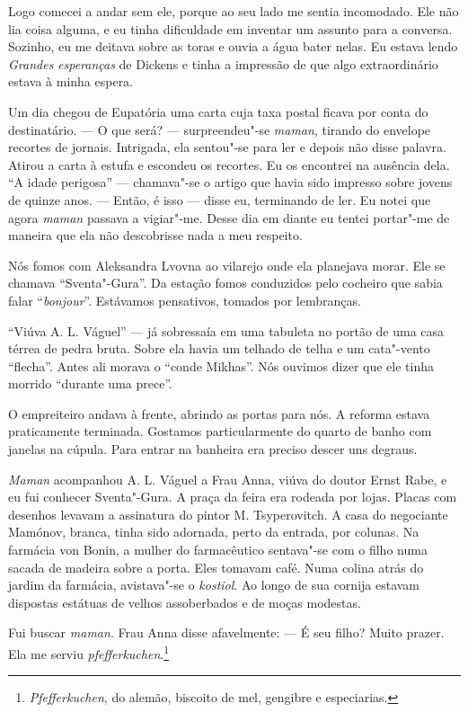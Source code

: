 Logo comecei a andar sem ele, porque ao seu lado me sentia incomodado.
Ele não lia coisa alguma, e eu tinha dificuldade em inventar um assunto
para a conversa. Sozinho, eu me deitava sobre as toras e ouvia a água
bater nelas. Eu estava lendo \emph{Grandes} \emph{esperanças} de Dickens
e tinha a impressão de que algo extraordinário estava à minha espera.

Um dia chegou de Eupatória uma carta cuja taxa postal ficava por conta
do destinatário. --- O que será? --- surpreendeu"-se \emph{maman},
tirando do envelope recortes de jornais. Intrigada, ela sentou"-se para
ler e depois não disse palavra. Atirou a carta à estufa e escondeu os
recortes. Eu os encontrei na ausência dela. ``A idade perigosa'' ---
chamava"-se o artigo que havia sido impresso sobre jovens de quinze anos.
--- Então, é isso --- disse eu, terminando de ler. Eu notei que agora
\emph{maman} passava a vigiar"-me. Desse dia em diante eu tentei
portar"-me de maneira que ela não descobrisse nada a meu respeito.

Nós fomos com Aleksandra Lvovna ao vilarejo onde ela planejava morar.
Ele se chamava ``Sventa"-Gura''. Da estação fomos conduzidos pelo
cocheiro que sabia falar ``\emph{bonjour}''. Estávamos pensativos,
tomados por lembranças.

``Viúva A. L. Váguel'' --- já sobressaía em uma tabuleta no portão de
uma casa térrea de pedra bruta. Sobre ela havia um telhado de telha e um
cata"-vento ``flecha''. Antes ali morava o ``conde Mikhas''. Nós ouvimos
dizer que ele tinha morrido ``durante uma prece''.

O empreiteiro andava à frente, abrindo as portas para nós. A reforma
estava praticamente terminada. Gostamos particularmente do quarto de
banho com janelas na cúpula. Para entrar na banheira era preciso descer
uns degraus.

\emph{Maman} acompanhou A. L. Váguel a Frau Anna, viúva do doutor Ernst
Rabe, e eu fui conhecer Sventa"-Gura. A praça da feira era rodeada por
lojas. Placas com desenhos levavam a assinatura do pintor M.
Tsyperovitch. A casa do negociante Mamónov, branca, tinha sido adornada,
perto da entrada, por colunas. Na farmácia von Bonin, a mulher do
farmacêutico sentava"-se com o filho numa sacada de madeira sobre a
porta. Eles tomavam café. Numa colina atrás do jardim da farmácia,
avistava"-se o \emph{kostiol}. Ao longo de sua cornija estavam dispostas
estátuas de velhos assoberbados e de moças modestas.

Fui buscar \emph{maman}. Frau Anna disse afavelmente: --- É seu filho?
Muito prazer. Ela me serviu \emph{pfefferkuchen}.\footnote{\emph{Pfefferkuchen},
  do alemão, biscoito de mel, gengibre e especiarias.}

